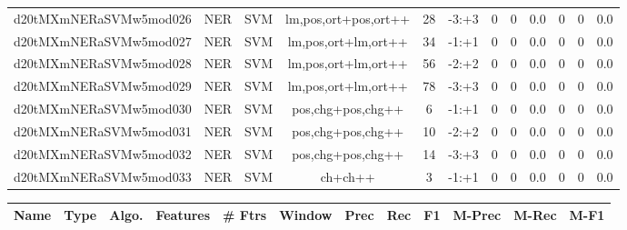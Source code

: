 \documentclass[a4paper]{article}
\begin{document}
\begin{landscape}
\begin{center}
\begin{tabular}{ |c|c|c|c|c|c|c|c|c|c|c|c|}
 
 	
 	\small{ d20tMXmNERaSVMw5mod026 } & \small{ NER} & \small{  SVM }  & lm,pos,ort+pos,ort++  &  28 &  \small{  -3:+3 }  &  0 & 0 & 0.0  &  0 & 0 & 0.0 \\
 	

 
 	
 	\small{ d20tMXmNERaSVMw5mod027 } & \small{ NER} & \small{  SVM }  & lm,pos,ort+lm,ort++  &  34 &  \small{  -1:+1 }  &  0 & 0 & 0.0  &  0 & 0 & 0.0 \\
 	

 
 	
 	\small{ d20tMXmNERaSVMw5mod028 } & \small{ NER} & \small{  SVM }  & lm,pos,ort+lm,ort++  &  56 &  \small{  -2:+2 }  &  0 & 0 & 0.0  &  0 & 0 & 0.0 \\
 	

 
 	
 	\small{ d20tMXmNERaSVMw5mod029 } & \small{ NER} & \small{  SVM }  & lm,pos,ort+lm,ort++  &  78 &  \small{  -3:+3 }  &  0 & 0 & 0.0  &  0 & 0 & 0.0 \\
 	

 
 	
 	\small{ d20tMXmNERaSVMw5mod030 } & \small{ NER} & \small{  SVM }  & pos,chg+pos,chg++  &  6 &  \small{  -1:+1 }  &  0 & 0 & 0.0  &  0 & 0 & 0.0 \\
 	

 
 	
 	\small{ d20tMXmNERaSVMw5mod031 } & \small{ NER} & \small{  SVM }  & pos,chg+pos,chg++  &  10 &  \small{  -2:+2 }  &  0 & 0 & 0.0  &  0 & 0 & 0.0 \\
 	

 
 	
 	\small{ d20tMXmNERaSVMw5mod032 } & \small{ NER} & \small{  SVM }  & pos,chg+pos,chg++  &  14 &  \small{  -3:+3 }  &  0 & 0 & 0.0  &  0 & 0 & 0.0 \\
 	

 
 	
 	\small{ d20tMXmNERaSVMw5mod033 } & \small{ NER} & \small{  SVM }  & ch+ch++  &  3 &  \small{  -1:+1 }  &  0 & 0 & 0.0  &  0 & 0 & 0.0 \\
 	
 \hline
\end{tabular}
\end{center}




\begin{center}
\begin{tabular}{ |c|c|c|c|c|c|c|c|c|c|c|c|} 
 \hline
 	Name & Type & Algo. & Features & \# Ftrs & Window & Prec & Rec & F1 & M-Prec & M-Rec & M-F1\\
 \hline


\end{tabular}
\end{center}
\end{landscape}
\end{document}
